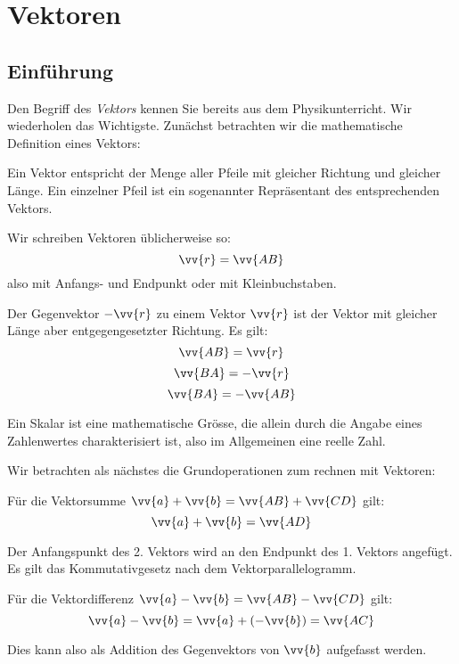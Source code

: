 \chapter{Vektoren}

\section{Einführung}
Den Begriff des \textit{Vektors} kennen Sie bereits aus dem Physikunterricht. Wir wiederholen das Wichtigste. Zunächst betrachten wir die mathematische Definition eines Vektors:

\begin{definition}
Ein Vektor entspricht der Menge aller Pfeile mit gleicher
Richtung und gleicher Länge.
Ein einzelner Pfeil ist ein sogenannter Repräsentant des
entsprechenden Vektors.

\end{definition}
Wir schreiben Vektoren üblicherweise so:
\[ \vv{r} = \vv{AB} \]
also mit Anfangs- und Endpunkt oder mit Kleinbuchstaben.

\begin{definition}
Der Gegenvektor $-\vv{r}$ zu einem Vektor $\vv{r}$ ist der Vektor mit gleicher Länge aber entgegengesetzter Richtung. Es gilt:
\[ \vv{AB} = \vv{r} \]
\[ \vv{BA} = -\vv{r} \]
\[ \vv{BA} = -\vv{AB} \]
\end{definition}

\begin{definition}
Ein Skalar ist eine mathematische Grösse, die allein durch die Angabe eines Zahlenwertes charakterisiert ist, also im Allgemeinen eine reelle Zahl.
\end{definition}

Wir betrachten als nächstes die Grundoperationen zum rechnen mit Vektoren:
\begin{theorem}[Vektorsumme]
Für die Vektorsumme $\vv{a} + \vv{b} = \vv{AB} + \vv{CD}$ gilt:
\[ \vv{a} + \vv{b} = \vv{AD} \]
\end{theorem}
Der Anfangspunkt des 2. Vektors wird an den Endpunkt des
1. Vektors angefügt. Es gilt das Kommutativgesetz nach dem Vektorparallelogramm. 

\begin{theorem}[Vektordifferenz]
Für die Vektordifferenz $\vv{a} - \vv{b} = \vv{AB} - \vv{CD}$ gilt:
\[ \vv{a} - \vv{b} = \vv{a} + (-\vv{b}) = \vv{AC} \]
\end{theorem}
Dies kann also als Addition des Gegenvektors von $\vv{b}$ aufgefasst werden.

